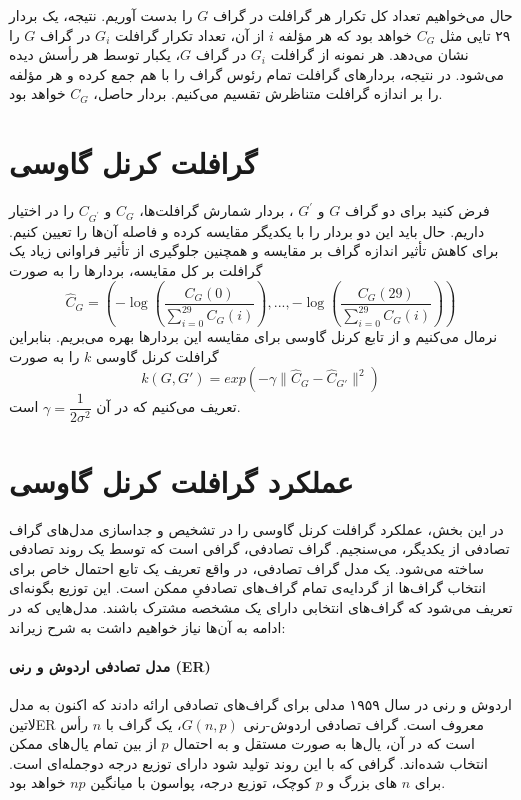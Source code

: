 حال می‌خواهیم تعداد کل تکرار هر گرافلت‌ در گراف $G$ را بدست آوریم. نتیجه، یک بردار ۲۹ تایی مثل $C_G$ خواهد بود که هر مؤلفه $i$ از آن، تعداد تکرار گرافلت $G_i$ در گراف $G$ را نشان می‌دهد. هر نمونه از گرافلت $G_i$ در گراف $G$، یکبار توسط هر رأسش دیده می‌شود. در نتیجه، بردارهای گرافلت تمام رئوس گراف را با هم جمع کرده و هر مؤلفه را بر اندازه گرافلت متناظرش تقسیم می‌کنیم. بردار حاصل، $C_G$ خواهد بود.

\section{گرافلت کرنل گاوسی}
فرض کنید برای دو گراف $G$ و $G^\prime$ ، بردار شمارش گرافلت‌ها، $C_G$ و $C_{G^\prime}$ را در اختیار داریم. حال باید این دو بردار را با یکدیگر مقایسه کرده و فاصله آن‌ها را تعیین کنیم. برای کاهش تأثیر اندازه گراف‌ بر مقایسه و همچنین جلوگیری از تأثیر فراوانی زیاد یک گرافلت بر کل مقایسه، بردارها را به صورت
\begin{equation}
\label{eq:feature-vector}
\hat{C}_G = (-\log(\dfrac{C_G(0)}{\sum _{i=0}^{29} C_G(i)}),...,-\log(\dfrac{C_G(29)}{\sum _{i=0}^{29} C_G(i)}))
\end{equation}
نرمال می‌کنیم و از تابع کرنل گاوسی برای مقایسه این بردارها بهره می‌بریم. بنابراین گرافلت کرنل گاوسی $k$ را به صورت
\begin{equation}
\label{eqn:kernelfunction}
k(G,G') = exp(-\gamma\parallel \hat{C}_G - \hat{C}_{G'}\parallel^2)
\end{equation}
تعریف می‌کنیم که در آن $\gamma = \dfrac{1}{2\sigma^2}$ است.

\section{عملکرد گرافلت کرنل گاوسی}
در این بخش، عملکرد گرافلت کرنل گاوسی را در تشخیص و جداسازی مدل‌های گراف تصادفی از یکدیگر، می‌سنجیم. گراف تصادفی، گرافی است که توسط یک روند تصادفی ساخته می‌شود. یک مدل‌ گراف تصادفی، در واقع تعریف یک تابع احتمال خاص برای انتخاب گراف‌ها از گردایه‌ی تمام گراف‌های تصادفیِ ممکن است. این توزیع بگونه‌ای تعریف می‌شود که گراف‌های انتخابی دارای یک مشخصه مشترک باشند. مدل‌هایی که در ادامه به آن‌ها نیاز خواهیم داشت به شرح زیراند:

\paragraph{مدل تصادفی اردوش و رنی (ER)}
اردوش و رنی در سال ۱۹۵۹ مدلی برای گراف‌های تصادفی ارائه دادند که اکنون به مدل ‌لاتین{ER} معروف است. گراف تصادفی اردوش-رنی $G(n,p)$، یک گراف با $n$ رأس است که در آن، یال‌ها به صورت مستقل و به احتمال $p$ از بین تمام یال‌های ممکن انتخاب شده‌اند. گرافی که با این روند تولید شود دارای توزیع درجه دوجمله‌ای است. برای $n$ های بزرگ و $p$‌ کوچک، توزیع درجه، پواسون با میانگین $np$ خواهد بود.


